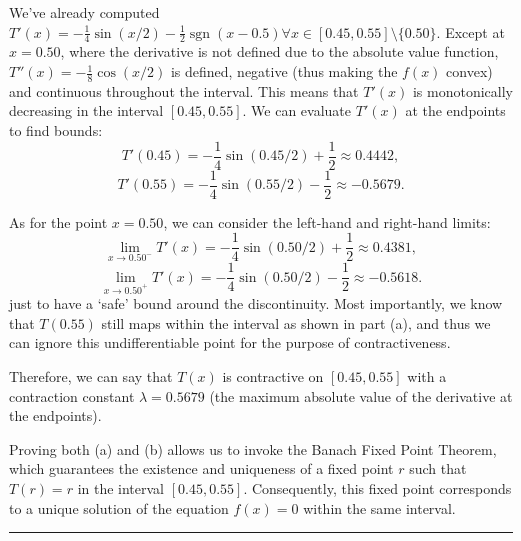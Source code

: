 We've already computed $T'(x) = -\frac{1}{4}\sin(x/2) - \frac{1}{2}\operatorname{sgn}(x-0.5) \forall x \in [0.45, 0.55]\setminus\{0.50\}$. Except at $x=0.50$, where the derivative is not defined due to the absolute value function, $T''(x) = -\frac{1}{8}\cos(x/2)$ is defined, negative (thus making the $f(x)$ convex) and continuous throughout the interval.
This means that $T'(x)$ is monotonically decreasing in the interval $[0.45, 0.55]$. We can evaluate $T'(x)$ at the endpoints to find bounds:
\[T'(0.45) = -\frac{1}{4}\sin(0.45/2) + \frac{1}{2} \approx 0.4442,\]
\[T'(0.55) = -\frac{1}{4}\sin(0.55/2) - \frac{1}{2} \approx -0.5679.\]

As for the point $x=0.50$, we can consider the left-hand and right-hand limits:
\[\lim_{x \to 0.50^-} T'(x) = -\frac{1}{4}\sin(0.50/2) + \frac{1}{2} \approx 0.4381,\]
\[\lim_{x \to 0.50^+} T'(x) = -\frac{1}{4}\sin(0.50/2) - \frac{1}{2} \approx -0.5618.\] just to have a `safe' bound around the discontinuity. Most importantly, we know that $T(0.55)$ still maps within the interval as shown in part (a), and thus we can ignore this undifferentiable point for the purpose of contractiveness.

Therefore, we can say that $T(x)$ is contractive on $[0.45, 0.55]$ with a contraction constant $\lambda = 0.5679$ (the maximum absolute value of the derivative at the endpoints).

\begin{center}
\end{center}

Proving both (a) and (b) allows us to invoke the Banach Fixed Point Theorem, which guarantees the existence and uniqueness of a fixed point $r$ such that $T(r) = r$ in the interval \( [0.45, 0.55] \). Consequently, this fixed point corresponds to a unique solution of the equation \( f(x) = 0 \) within the same interval.

\begin{center}
\end{center}

\vspace{2em}
\noindent\rule{\textwidth}{0.4pt}
